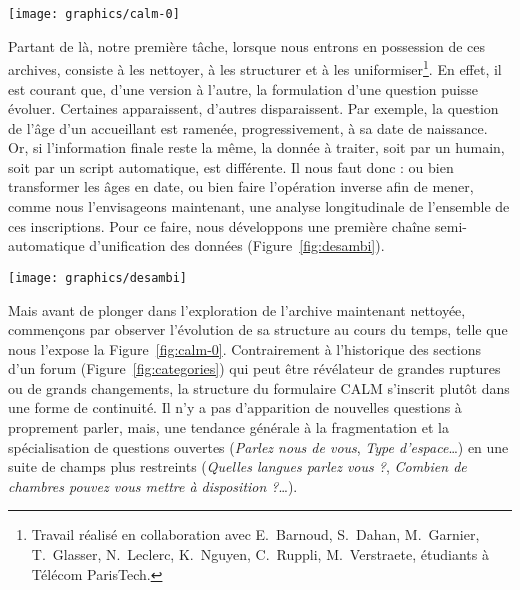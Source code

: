 \documentclass[symmetric,justified,marginals=raggedouter]{tufte-book}
\begin{document}
\begin{figure*}
  \texttt{[image: graphics/calm-0]}
  \caption{Évolution de la structure du questionnaire des accueillants}
  \label{fig:calm-0}
\end{figure*}     

\noindent Partant de là, notre première tâche, lorsque nous entrons en possession de ces archives, consiste à les nettoyer, à les structurer et à les uniformiser\footnote{\RaggedOuter Travail réalisé en collaboration avec E.~Barnoud, S.~Dahan, M.~Garnier, T.~Glasser, N.~Leclerc, K.~Nguyen, C.~Ruppli, M.~Verstraete, étudiants à Télécom ParisTech.}. En effet, il est courant que, d'une version à l'autre, la formulation d'une question puisse évoluer. Certaines apparaissent, d'autres disparaissent. Par exemple, la question de l'âge d'un accueillant est ramenée, progressivement, à sa date de naissance. Or, si l'information finale reste la même, la donnée à traiter, soit par un humain, soit par un script automatique, est différente. Il nous faut donc : ou bien transformer les âges en date, ou bien  faire l'opération inverse afin de mener, comme nous l'envisageons maintenant, une analyse longitudinale de l'ensemble de ces inscriptions. Pour ce faire, nous développons une première chaîne semi-automatique d'unification des données (Figure~\ref{fig:desambi}).

\begin{marginfigure}%
  \texttt{[image: graphics/desambi]}
  \vspace*{0.2cm}  
  \caption{Unification des différentes versions d'une même base de données}
  \label{fig:desambi}
\end{marginfigure} 

Mais avant de plonger dans l'exploration de l'archive maintenant nettoyée, commençons par observer l'évolution de sa structure au cours du temps, telle que nous l'expose la Figure~\ref{fig:calm-0}. Contrairement à l'historique des sections d'un forum (Figure~\ref{fig:categories}) qui peut être révélateur de grandes ruptures ou de grands changements, la structure du formulaire CALM s'inscrit plutôt dans une forme de continuité. Il n'y a pas d'apparition de nouvelles questions à proprement parler, mais, une tendance générale à la fragmentation et la spécialisation de questions ouvertes (\textit{Parlez nous de vous}, \textit{Type d'espace}\ldots{}) en une suite de champs plus restreints (\textit{Quelles langues parlez vous ?}, \textit{Combien de chambres pouvez vous mettre à disposition ?}\ldots{}). 
\end{document}
